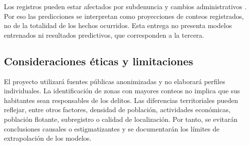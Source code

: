 Los registros pueden estar afectados por subdenuncia y cambios administrativos \citep{riascos2023}. Por eso las predicciones se interpretan como proyecciones de conteos registrados, no de la totalidad de los hechos ocurridos. Esta entrega no presenta modelos entrenados ni resultados predictivos, que corresponden a la tercera.

\subsection{Consideraciones éticas y limitaciones}

El proyecto utilizará fuentes públicas anonimizadas y no elaborará perfiles individuales. La identificación de zonas con mayores conteos no implica que sus habitantes sean responsables de los delitos. Las diferencias territoriales pueden reflejar, entre otros factores, densidad de población, actividades económicas, población flotante, subregistro o calidad de localización. Por tanto, se evitarán conclusiones causales o estigmatizantes y se documentarán los límites de extrapolación de los modelos.
